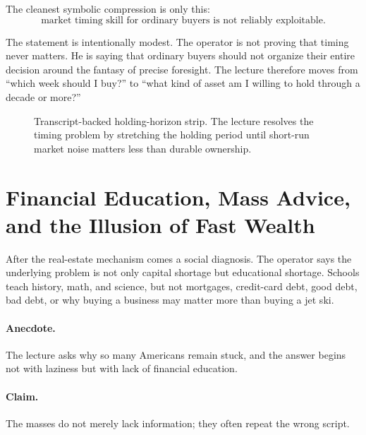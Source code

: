 The cleanest symbolic compression is only this:
\begin{equation}
\text{market timing skill for ordinary buyers is not reliably exploitable}.
\end{equation}

The statement is intentionally modest. The operator is not proving that timing never matters. He is saying that ordinary buyers should not organize their entire decision around the fantasy of precise foresight. The lecture therefore moves from ``which week should I buy?'' to ``what kind of asset am I willing to hold through a decade or more?''

\begin{figure}[h]
\centering
{}
\caption{Transcript-backed holding-horizon strip. The lecture resolves the timing problem by stretching the holding period until short-run market noise matters less than durable ownership.}
\end{figure}

\section{Financial Education, Mass Advice, and the Illusion of Fast Wealth}

After the real-estate mechanism comes a social diagnosis. The operator says the underlying problem is not only capital shortage but educational shortage. Schools teach history, math, and science, but not mortgages, credit-card debt, good debt, bad debt, or why buying a business may matter more than buying a jet ski.

\paragraph{Anecdote.}
The lecture asks why so many Americans remain stuck, and the answer begins not with laziness but with lack of financial education.

\paragraph{Claim.}
The masses do not merely lack information; they often repeat the wrong script.

